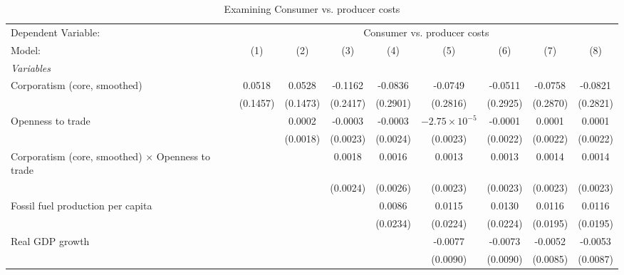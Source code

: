 
\begin{table}[htbp]
   \caption{Examining Consumer vs. producer costs}
   \centering
   \begin{tabular}{lcccccccc}
      \tabularnewline \midrule \midrule
      Dependent Variable: & \multicolumn{8}{c}{Consumer vs. producer costs}\\
      Model:                                                   & (1)      & (2)      & (3)      & (4)      & (5)                    & (6)      & (7)      & (8)\\  
      \midrule
      \emph{Variables}\\
      Corporatism (core, smoothed)                             & 0.0518   & 0.0528   & -0.1162  & -0.0836  & -0.0749                & -0.0511  & -0.0758  & -0.0821\\   
                                                               & (0.1457) & (0.1473) & (0.2417) & (0.2901) & (0.2816)               & (0.2925) & (0.2870) & (0.2821)\\   
      Openness to trade                                        &          & 0.0002   & -0.0003  & -0.0003  & $-2.75\times 10^{-5}$  & -0.0001  & 0.0001   & 0.0001\\   
                                                               &          & (0.0018) & (0.0023) & (0.0024) & (0.0023)               & (0.0022) & (0.0022) & (0.0022)\\   
      Corporatism (core, smoothed) $\times$ Openness to trade  &          &          & 0.0018   & 0.0016   & 0.0013                 & 0.0013   & 0.0014   & 0.0014\\   
                                                               &          &          & (0.0024) & (0.0026) & (0.0023)               & (0.0023) & (0.0023) & (0.0023)\\   
      Fossil fuel production per capita                        &          &          &          & 0.0086   & 0.0115                 & 0.0130   & 0.0116   & 0.0116\\   
                                                               &          &          &          & (0.0234) & (0.0224)               & (0.0224) & (0.0195) & (0.0195)\\   
      Real GDP growth                                          &          &          &          &          & -0.0077                & -0.0073  & -0.0052  & -0.0053\\   
                                                               &          &          &          &          & (0.0090)               & (0.0090) & (0.0085) & (0.0087)\\   

\end{tabular}
\end{table}
